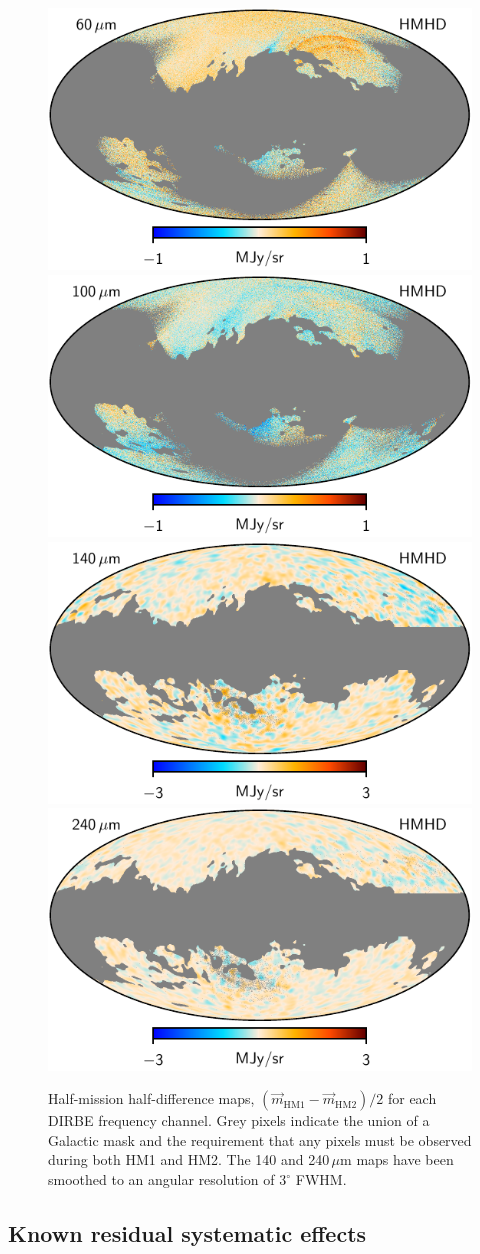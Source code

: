 \documentclass{aa}
\newcommand{\m}[0]{\vec{m}}
\begin{document}
\begin{figure}
  \includegraphics[width=0.42\linewidth]{figs/dirbe_07_hmhd_v1.pdf}\hspace*{5mm}
  \includegraphics[width=0.42\linewidth]{figs/dirbe_08_hmhd_v1.pdf}\\
  \includegraphics[width=0.42\linewidth]{figs/dirbe_09_hmhd_v1_3deg.pdf}\hspace*{5mm}
  \includegraphics[width=0.42\linewidth]{figs/dirbe_10_hmhd_v1_3deg.pdf}
  \caption{Half-mission half-difference maps, $(\m_{\mathrm{HM1}}-\m_{\mathrm{HM2}})/2$ for each DIRBE frequency channel. Grey pixels indicate the union of a Galactic mask and the requirement that any pixels must be observed during both HM1 and HM2. The 140 and 240\,$\mu\mathrm{m}$ maps have been smoothed to an angular resolution of $3^{\circ}$ FWHM.}
  \label{fig:hmhd}
\end{figure}

\subsection{Known residual systematic effects}
\end{document}

